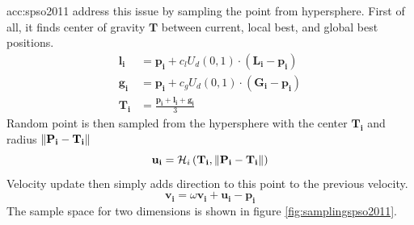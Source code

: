 \acrshort{acc:spso2011} address this issue by sampling the point from hypersphere. First of all, it finds center of gravity $\mathbf{T}$ between current, local best, and global best positions.
\begin{align*}
    \mathbf{l_i} &= \mathbf{p_i} + c_l U_d\left( 0,1 \right) \cdot \left( \mathbf{L_i} - \mathbf{p_i} \right) \\
    \mathbf{g_i} &= \mathbf{p_i} + c_g U_d\left( 0,1 \right) \cdot \left( \mathbf{G_i} - \mathbf{p_i} \right) \\
    \mathbf{T_i} &= \frac{\mathbf{p_i}+\mathbf{l_i}+\mathbf{g_i}}{3}
\end{align*}
Random point is then sampled from the hypersphere with the center $\mathbf{T_i}$ and radius $\left\lVert\mathbf{P_i} - \mathbf{T_i}\right\rVert$
$$
\mathbf{u_i} = \mathcal{H}_i\left(\mathbf{T_i}, \left\lVert\mathbf{P_i} - \mathbf{T_i}\right\rVert\right)
$$
Velocity update then simply adds direction to this point to the previous velocity.
$$
\mathbf{v_i} = \omega\mathbf{v_i}+\mathbf{u_i}-\mathbf{p_i}
$$
The sample space for two dimensions is shown in figure \ref{fig:samplingspso2011}.

